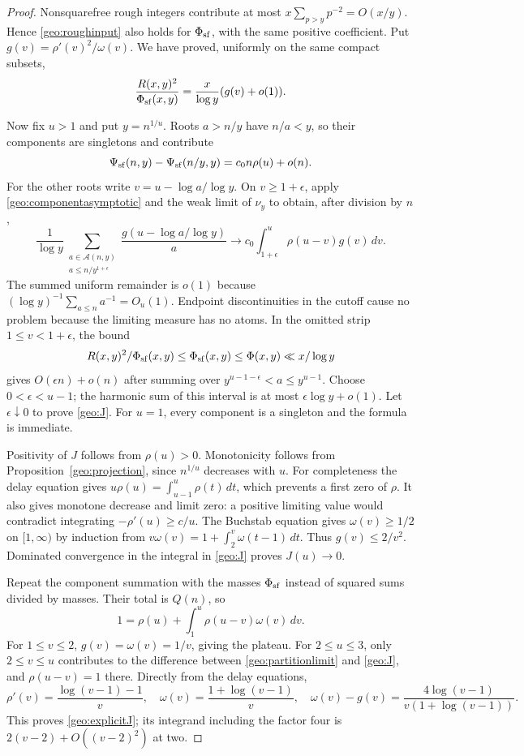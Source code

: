 \begin{proof}
Nonsquarefree rough integers contribute at most $x\sum_{p>y}p^{-2}=O(x/y)$. Hence \eqref{geo:roughinput} also holds for $\Phi_{\mathrm{sf}}$, with the same positive coefficient. Put $g(v)=\rho'(v)^2/\omega(v)$. We have proved, uniformly on the same compact subsets,
\begin{equation}\label{geo:componentasymptotic}
 \frac{R(x,y)^2}{\Phi_{\mathrm{sf}}(x,y)}
       =\frac{x}{\log y}(g(v)+o(1)).
\end{equation}

Now fix $u>1$ and put $y=n^{1/u}$. Roots $a>n/y$ have $n/a<y$, so their components are singletons and contribute
\[
 \Psi_{\mathrm{sf}}(n,y)-\Psi_{\mathrm{sf}}(n/y,y)=c_0n\rho(u)+o(n).
\]
For the other roots write $v=u-\log a/\log y$. On $v\ge1+\epsilon$, apply \eqref{geo:componentasymptotic} and the weak limit of $\nu_y$ to obtain, after division by $n$,
\[
 \frac1{\log y}\sum_{\substack{a\in\mathcal A(n,y)\\a\le n/y^{1+\epsilon}}}
       \frac{g(u-\log a/\log y)}a
 \longrightarrow c_0\int_{1+\epsilon}^u\rho(u-v)g(v)\,dv.
\]
The summed uniform remainder is $o(1)$ because $(\log y)^{-1}\sum_{a\le n}a^{-1}=O_u(1)$. Endpoint discontinuities in the cutoff cause no problem because the limiting measure has no atoms. In the omitted strip $1\le v<1+\epsilon$, the bound
\[
 R(x,y)^2/\Phi_{\mathrm{sf}}(x,y)\le\Phi_{\mathrm{sf}}(x,y)\le\Phi(x,y)\ll x/\log y
\]
gives $O(\epsilon n)+o(n)$ after summing over $y^{u-1-\epsilon}<a\le y^{u-1}$. Choose $0<\epsilon<u-1$; the harmonic sum of this interval is at most $\epsilon\log y+o(1)$. Let $\epsilon\downarrow0$ to prove \eqref{geo:J}. For $u=1$, every component is a singleton and the formula is immediate.

Positivity of $J$ follows from $\rho(u)>0$. Monotonicity follows from Proposition~\ref{geo:projection}, since $n^{1/u}$ decreases with $u$. For completeness the delay equation gives $u\rho(u)=\int_{u-1}^u\rho(t)\,dt$, which prevents a first zero of $\rho$. It also gives monotone decrease and limit zero: a positive limiting value would contradict integrating $-\rho'(u)\ge c/u$. The Buchstab equation gives $\omega(v)\ge1/2$ on $[1,\infty)$ by induction from $v\omega(v)=1+\int_2^v\omega(t-1)\,dt$. Thus $g(v)\le2/v^2$. Dominated convergence in the integral in \eqref{geo:J} proves $J(u)\to0$.

Repeat the component summation with the masses $\Phi_{\mathrm{sf}}$ instead of squared sums divided by masses. Their total is $Q(n)$, so
\begin{equation}\label{geo:partitionlimit}
 1=\rho(u)+\int_1^u\rho(u-v)\omega(v)\,dv.
\end{equation}
For $1\le v\le2$, $g(v)=\omega(v)=1/v$, giving the plateau. For $2\le u\le3$, only $2\le v\le u$ contributes to the difference between \eqref{geo:partitionlimit} and \eqref{geo:J}, and $\rho(u-v)=1$ there. Directly from the delay equations,
\[
 \rho'(v)=\frac{\log(v-1)-1}{v},\quad
 \omega(v)=\frac{1+\log(v-1)}v,\quad
 \omega(v)-g(v)=\frac{4\log(v-1)}{v(1+\log(v-1))}.
\]
This proves \eqref{geo:explicitJ}; its integrand including the factor four is $2(v-2)+O((v-2)^2)$ at two.


\end{proof}
